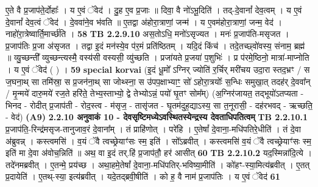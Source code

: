\documentclass[17pt]{extarticle}
\begin{document}
                  ए॒ते वै प्र॒जाप॑ते॒र्दोहाः᳚ । य ए॒वं ॅवेद॑ । दु॒ह ए॒व प्र॒जाः ॥ दिवा॒ वै नो॑ऽभू॒दिति॑ । तद्-दे॒वानां᳚ देव॒त्वम् । य ए॒वं दे॒वानां᳚ देव॒त्वं ॅवेद॑ । दे॒ववा॑ने॒व भ॑वति ॥ ए॒तद्वा अ॑होरा॒त्राणां॒ जन्म॑ । य ए॒वम॑होरा॒त्राणां॒ जन्म॒ वेद॑ । नाहो॑रा॒त्रेष्वार्ति॒मार्च्छ॑ति । \textbf{ 58} \newline
                  \newline
                                \textbf{ TB 2.2.9.10} \newline
                  अस॒तोऽधि॒ मनो॑ऽसृज्यत । मनः॑ प्र॒जाप॑ति-मसृजत । प्र॒जाप॑तिः प्र॒जा अ॑सृजत । तद्वा इ॒दं मन॑स्ये॒व प॑र॒मं प्रति॑ष्ठितम् । यदि॒दं किंच॑ । तदे॒तच्छ्वो॑वस्य॒ संनाम॒ ब्रह्म॑ ॥ व्यु॒च्छन्ती᳚ व्युच्छन्त्यस्मै॒ वस्य॑सी वस्यसी॒ व्यु॑च्छति । प्रजा॑यते प्र॒जया॑ प॒शुभिः॑ । प्र प॑रमे॒ष्ठिनो॒ मात्रा॑-माप्नोति । य ए॒वं ॅवेद॑ ( ) । \textbf{ 59} \newline
                  \newline
                                                        \textbf{special korvai} \newline
              (इ॒दं धू॒मो᳚ ऽग्निर् ज्योति॑ र॒र्चिर् मरी॑चय उदा॒रा स्तद॒भ्रꣳ / स ज॒घना॒थ् सा तमि॑स्रा॒ स प्र॒जन॑ना॒थ् सा जोथ्स्ना॒ स उ॑पप॒क्षाभ्याꣳ॒॒ सो॑ ऽहोरा॒त्रयोः᳚ स॒न्धिः समुखा॒त् तदह॑र् दे॒ववा᳚न् / मृ॒न्मये॑ दारु॒मये॑ रज॒ते हरि॑ते॒ तेभ्य॒स्ताभ्यो॒ द्वे तेभ्योऽन्नं॒ पयो॑ घृ॒तꣳ सोम᳚म्) \newline
                                (अ॒ग्निर॑जायत॒ तद्भूयो॑ऽतप्यता - भिनद - रोदीत् प्र॒जाप॑ती - रोद॒स्त्व - म॑सृज॒ - तासृ॑जत - घृ॒तम॑दुह॒द्याऽस्य॒ सा त॒नूरासी॒ - दह॑रभवद् - ऋच्छति॒ - वेद॑) \textbf{(A9)} \newline \newline
                \textbf{ 2.2.10    अनुवाकं   10 - देवसृष्टिमध्येऽवस्थितस्येन्द्रस्य देवताधिपतित्वम्} \newline
                                \textbf{ TB 2.2.10.1} \newline
                  प्र॒जाप॑ति॒-रिन्द्र॑मसृज-तानुजाव॒रं दे॒वाना᳚म् । तं प्राहि॑णोत् । परे॑हि । ए॒तेषां᳚ दे॒वाना॒-मधि॑पतिरे॒धीति॑ । तं दे॒वा अ॑ब्रुवन्न् । कस्त्वमसि॑ । व॒यं ॅवै त्वच्छ्रेयाꣳ॑सः स्म॒ इति॑ । सो᳚ऽब्रवीत् । कस्त्वमसि॑ व॒यं ॅवै त्वच्छ्रेयाꣳ॑सः स्म॒ इति॑ मा दे॒वा अ॑वोच॒न्निति॑ ॥ अथ॒ वा इ॒दं तर्.हि॑ प्र॒जाप॑तौ॒ हर॑ आसीत् \textbf{ 60} \newline
                  \newline
                                \textbf{ TB 2.2.10.2} \newline
                  यद॒स्मिन्ना॑दि॒त्ये । तदे॑नमब्रवीत् । ए॒तन्मे॒ प्रय॑च्छ । अथा॒हमे॒तेषां᳚ दे॒वाना॒-मधि॑पतिर्-भविष्या॒मीति॑ । को॑हꣳ-स्या॒मित्य॑ब्रवीत् । ए॒तत् प्र॒दायेति॑ । ए॒तथ्-स्या॒ इत्य॑ब्रवीत् । यदे॒तद्ब्रवी॒षीति॑ । को ह॒ वै नाम॑ प्र॒जाप॑तिः । य ए॒वं ॅवेद॑ \textbf{ 61} \newline
\end{document}
